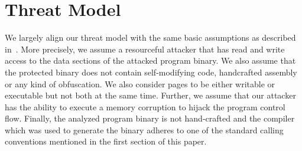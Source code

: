 \section{Threat Model}
\label{Adversary Model}

We largely align our threat model with the same basic assumptions as described in~\cite{veen:typearmor}. 
More precisely, we assume a resourceful attacker that has read and write access to the data 
sections of the attacked program binary. We also assume that the protected binary does not contain 
self-modifying code, handcrafted assembly or any kind of obfuscation. We also consider pages 
to be either writable or executable but not both at the same time. Further, we assume 
that our attacker has the ability to execute a memory corruption to hijack the program
control flow. Finally, the analyzed program binary is not hand-crafted and the compiler
which was used to generate the binary adheres to one of the 
standard calling conventions mentioned in the first section of this paper.